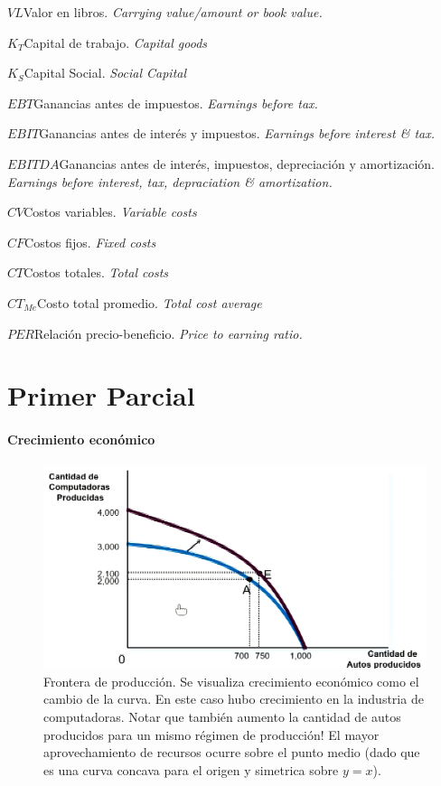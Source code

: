 \documentclass[twocolumn,10pt]{article}
\newcommand{\glossml}[3]{$#1$\indent #2 \emph{#3}  \par \vspace{.4cm} } %
\begin{document}
\glossml{VL}{Valor en libros.}{Carrying value/amount or book value.}
\glossml{K_T}{Capital de trabajo.}{Capital goods}
\glossml{K_S}{Capital Social.}{Social Capital}

\glossml{EBT}{Ganancias antes de impuestos.}{Earnings before tax.}
\glossml{EBIT}{Ganancias antes de interés y impuestos.}{Earnings before interest \& tax.}
\glossml{EBITDA}{Ganancias antes de interés, impuestos, depreciación y amortización.}{Earnings before interest, tax, depraciation \& amortization.}
\glossml{CV}{Costos variables.}{Variable costs}
\glossml{CF}{Costos fijos.}{Fixed costs}
\glossml{CT}{Costos totales.}{Total costs}
\glossml{CT_{Me}}{Costo total promedio.}{Total cost average}

\glossml{PER}{Relación precio-beneficio.}{Price to earning ratio.}


\newcommand{\fiN}{\ensuremath{f_i^N}}

\tableofcontents

\newpage
\part{Primer Parcial}
\subsection{Crecimiento económico}
\begin{figure}[htb!]
	\centering
	\includegraphics[width=1\linewidth]{fig/frontProd}
	\caption{Frontera de producción. Se visualiza crecimiento econ\'omico como el cambio de la curva. En este caso hubo crecimiento en la industria de computadoras. Notar que tambi\'en aumento la cantidad de autos producidos para un mismo r\'egimen de producci\'on! El mayor aprovechamiento de recursos ocurre sobre el punto medio (dado que es una curva concava para el origen y simetrica sobre $y=x$).}
	\label{fig:frontprod}
\end{figure}
\end{document}
